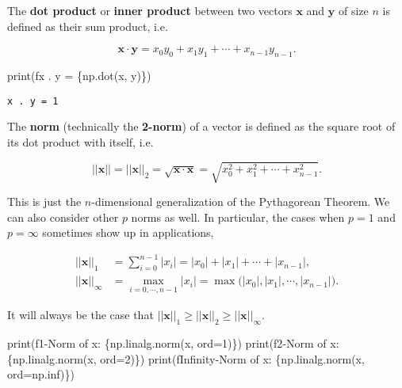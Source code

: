 \documentclass[
  letterpaper,
  DIV=11,
  numbers=noendperiod]{scrreprt}
\newenvironment{Shaded}{\begin{snugshade}}{\end{snugshade}}
\newcommand{\BuiltInTok}[1]{\textcolor[rgb]{0.00,0.23,0.31}{#1}}
\newcommand{\DecValTok}[1]{\textcolor[rgb]{0.68,0.00,0.00}{#1}}
\newcommand{\NormalTok}[1]{\textcolor[rgb]{0.00,0.23,0.31}{#1}}
\newcommand{\OperatorTok}[1]{\textcolor[rgb]{0.37,0.37,0.37}{#1}}
\newcommand{\SpecialCharTok}[1]{\textcolor[rgb]{0.37,0.37,0.37}{#1}}
\newcommand{\SpecialStringTok}[1]{\textcolor[rgb]{0.13,0.47,0.30}{#1}}
\begin{document}
The \textbf{dot product} or \textbf{inner product} between two vectors
\(\mathbf{x}\) and \(\mathbf{y}\) of size \(n\) is defined as their sum
product, i.e.

\[\mathbf{x} \cdot \mathbf{y} = x_0y_0 + x_1y_1 + \cdots + x_{n-1}y_{n-1}.\]

\begin{Shaded}
\begin{Highlighting}[]
\BuiltInTok{print}\NormalTok{(}\SpecialStringTok{f\textquotesingle{}x . y = }\SpecialCharTok{\{}\NormalTok{np}\SpecialCharTok{.}\NormalTok{dot(x, y)}\SpecialCharTok{\}}\SpecialStringTok{\textquotesingle{}}\NormalTok{)}
\end{Highlighting}
\end{Shaded}

\begin{verbatim}
x . y = 1
\end{verbatim}

The \textbf{norm} (technically the \textbf{2-norm}) of a vector is
defined as the square root of its dot product with itself, i.e.

\[||\mathbf{x}|| = ||\mathbf{x}||_2 = \sqrt{\mathbf{x} \cdot \mathbf{x}} = \sqrt{x_0^2 + x_1^2 + \cdots + x_{n-1}^2}.\]

This is just the \(n\)-dimensional generalization of the Pythagorean
Theorem. We can also consider other \(p\) norms as well. In particular,
the cases when \(p=1\) and \(p=\infty\) sometimes show up in
applications,

\begin{align*}
||\mathbf{x}||_1 &= \sum_{i=0}^{n-1} |x_i| = |x_0| + |x_1| + \cdots + |x_{n-1}|, \\
||\mathbf{x}||_\infty &= \max_{i=0,\cdots,n-1} |x_i| = \max\big(|x_0|, |x_1|, \cdots, |x_{n-1}|\big).
\end{align*}

It will always be the case that
\(||\mathbf{x}||_1 \geq ||\mathbf{x}||_2 \geq ||\mathbf{x}||_\infty\).

\begin{Shaded}
\begin{Highlighting}[]
\BuiltInTok{print}\NormalTok{(}\SpecialStringTok{f\textquotesingle{}1{-}Norm of x: }\SpecialCharTok{\{}\NormalTok{np}\SpecialCharTok{.}\NormalTok{linalg}\SpecialCharTok{.}\NormalTok{norm(x, }\BuiltInTok{ord}\OperatorTok{=}\DecValTok{1}\NormalTok{)}\SpecialCharTok{\}}\SpecialStringTok{\textquotesingle{}}\NormalTok{)}
\BuiltInTok{print}\NormalTok{(}\SpecialStringTok{f\textquotesingle{}2{-}Norm of x: }\SpecialCharTok{\{}\NormalTok{np}\SpecialCharTok{.}\NormalTok{linalg}\SpecialCharTok{.}\NormalTok{norm(x, }\BuiltInTok{ord}\OperatorTok{=}\DecValTok{2}\NormalTok{)}\SpecialCharTok{\}}\SpecialStringTok{\textquotesingle{}}\NormalTok{)}
\BuiltInTok{print}\NormalTok{(}\SpecialStringTok{f\textquotesingle{}Infinity{-}Norm of x: }\SpecialCharTok{\{}\NormalTok{np}\SpecialCharTok{.}\NormalTok{linalg}\SpecialCharTok{.}\NormalTok{norm(x, }\BuiltInTok{ord}\OperatorTok{=}\NormalTok{np.inf)}\SpecialCharTok{\}}\SpecialStringTok{\textquotesingle{}}\NormalTok{)}
\end{Highlighting}
\end{Shaded}
\end{document}
